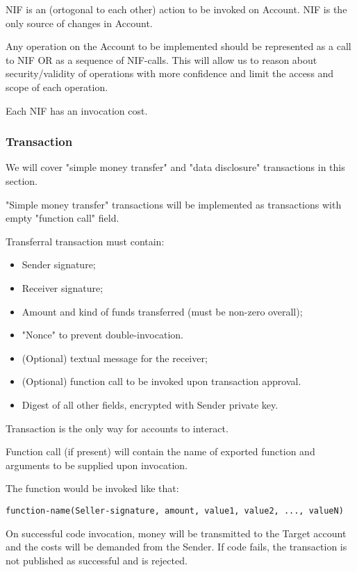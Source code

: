 NIF is an (ortogonal to each other) action to be invoked on Account.
NIF is the only source of changes in Account.

Any operation on the Account to be implemented should be represented as a call to NIF OR as a sequence of NIF-calls.
This will allow us to reason about security/validity of operations with more confidence and limit the access and scope of each operation.

Each NIF has an invocation cost.

\subsubsection{Transaction}

We will cover "simple money transfer" and "data disclosure" transactions in this section.

"Simple money transfer" transactions will be implemented as transactions with empty "function call" field.

Transferral transaction must contain:
\begin{itemize}
  \item Sender signature;
  \item Receiver signature;
  \item Amount and kind of funds transferred (must be non-zero overall);
  \item "Nonce" to prevent double-invocation.
  \item (Optional) textual message for the receiver;
  \item (Optional) function call to be invoked upon transaction approval.
  \item Digest of all other fields, encrypted with Sender private key.
\end{itemize}

Transaction is the only way for accounts to interact.

Function call (if present) will contain the name of exported function and arguments to be supplied upon invocation.

The function would be invoked like that:

\begin{verbatim}
function-name(Seller-signature, amount, value1, value2, ..., valueN)
\end{verbatim}

On successful code invocation, money will be transmitted to the Target account and the costs will be demanded from the Sender.
If code fails, the transaction is not published as successful and is rejected.

